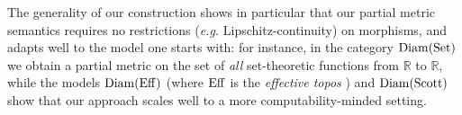 The generality of our construction shows in particular that our partial metric semantics requires no restrictions (\textit{e.g.} Lipschitz-continuity) on morphisms, and adapts well to the model one starts with: for instance, in the category $\operatorname{Diam}(\operatorname{Set})$ we obtain a partial metric on the set of \emph{all}  set-theoretic functions from $\mathbb R$ to $\mathbb R$, while the models $\operatorname{Diam}(\operatorname{Eff})$ (where $\operatorname{Eff}$ is the \emph{effective topos} \cite{hyland:effective-topos}) and $\operatorname{Diam}(\operatorname{Scott})$ show that our approach scales well to a more computability-minded setting.




%
%
%      
%
%

